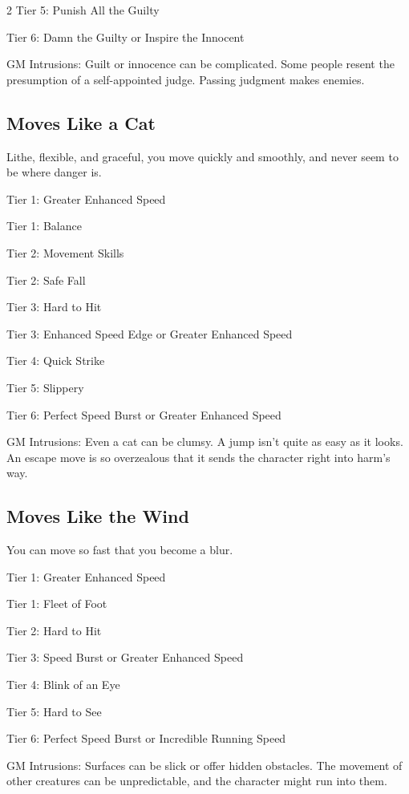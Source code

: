 \begin{multicols}{2}
Tier 5: Punish All the Guilty

Tier 6: Damn the Guilty or Inspire the Innocent

GM Intrusions: Guilt or innocence can be complicated. Some people resent the presumption of a self-appointed judge. Passing judgment makes enemies.

\subsection{Moves Like a Cat}

Lithe, flexible, and graceful, you move quickly and smoothly, and never seem to be where danger is.

Tier 1: Greater Enhanced Speed

Tier 1: Balance

Tier 2: Movement Skills

Tier 2: Safe Fall

Tier 3: Hard to Hit

Tier 3: Enhanced Speed Edge or Greater Enhanced Speed

Tier 4: Quick Strike

Tier 5: Slippery

Tier 6: Perfect Speed Burst or Greater Enhanced Speed

GM Intrusions: Even a cat can be clumsy. A jump isn’t quite as easy as it looks. An escape move is so overzealous that it sends the character right into harm’s way.

\subsection{Moves Like the Wind}

You can move so fast that you become a blur.

Tier 1: Greater Enhanced Speed

Tier 1: Fleet of Foot

Tier 2: Hard to Hit

Tier 3: Speed Burst or Greater Enhanced Speed

Tier 4: Blink of an Eye

Tier 5: Hard to See

Tier 6: Perfect Speed Burst or Incredible Running Speed

GM Intrusions: Surfaces can be slick or offer hidden obstacles. The movement of other creatures can be unpredictable, and the character might run into them. 


\end{multicols}
